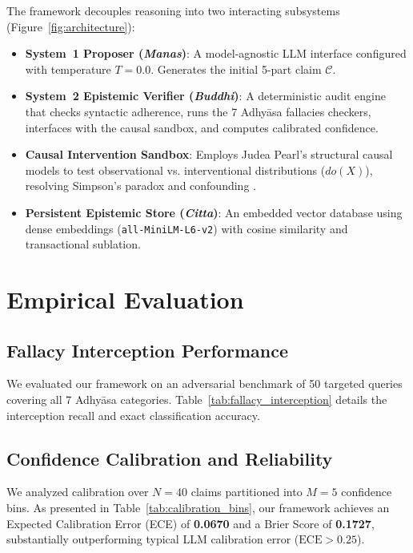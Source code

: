 \documentclass[11pt,a4paper]{article}
\begin{document}


The framework decouples reasoning into two interacting subsystems (Figure~\ref{fig:architecture}):
\begin{itemize}[leftmargin=*]
    \item \textbf{System~1 Proposer (\textit{Manas})}: A model-agnostic LLM interface configured with temperature $T=0.0$. Generates the initial 5-part claim $\mathcal{C}$.
    \item \textbf{System~2 Epistemic Verifier (\textit{Buddhi})}: A deterministic audit engine that checks syntactic adherence, runs the 7 Adhy\=asa fallacies checkers, interfaces with the causal sandbox, and computes calibrated confidence.
    \item \textbf{Causal Intervention Sandbox}: Employs Judea Pearl's structural causal models to test observational vs. interventional distributions ($do(X)$), resolving Simpson's paradox and confounding \citep{pearl2009causality}.
    \item \textbf{Persistent Epistemic Store (\textit{Citta})}: An embedded vector database using dense embeddings (\texttt{all-MiniLM-L6-v2}) with cosine similarity and transactional sublation.
\end{itemize}

\section{Empirical Evaluation}



\subsection{Fallacy Interception Performance}
We evaluated our framework on an adversarial benchmark of 50 targeted queries covering all 7 Adhy\=asa categories. Table~\ref{tab:fallacy_interception} details the interception recall and exact classification accuracy.



\subsection{Confidence Calibration and Reliability}
We analyzed calibration over $N=40$ claims partitioned into $M=5$ confidence bins. As presented in Table~\ref{tab:calibration_bins}, our framework achieves an Expected Calibration Error (ECE) of \textbf{0.0670} and a Brier Score of \textbf{0.1727}, substantially outperforming typical LLM calibration error ($\text{ECE} > 0.25$).
\end{document}
